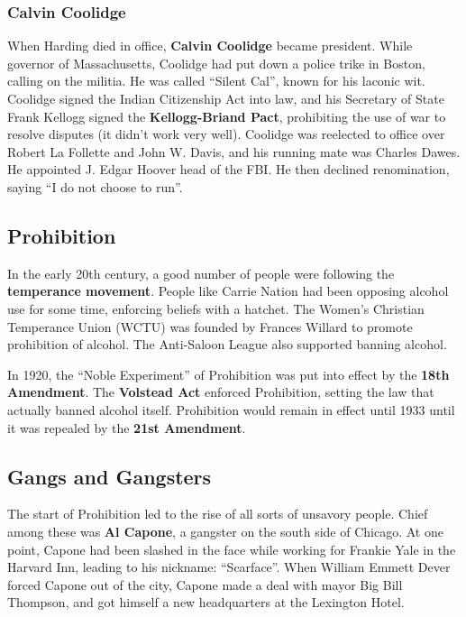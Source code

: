 \subsubsection*{Calvin Coolidge}

When Harding died in office, \textbf{Calvin Coolidge} became president.
While governor of Massachusetts, Coolidge had put down a police trike in Boston, calling on the militia.
He was called ``Silent Cal'', known for his laconic wit.
Coolidge signed the Indian Citizenship Act into law,
and his Secretary of State Frank Kellogg signed the \textbf{Kellogg-Briand Pact},
prohibiting the use of war to resolve disputes (it didn't work very well).
Coolidge was reelected to office over Robert La Follette and John W. Davis,
and his running mate was Charles Dawes.
He appointed J. Edgar Hoover head of the FBI\@.
He then declined renomination, saying ``I do not choose to run''.

\subsection*{Prohibition}

In the early 20th century, a good number of people were following the \textbf{temperance movement}.
People like Carrie Nation had been opposing alcohol use for some time,
enforcing beliefs with a hatchet.
The Women's Christian Temperance Union (WCTU)
was founded by Frances Willard to promote prohibition of alcohol.
The Anti-Saloon League also supported banning alcohol.

In 1920, the ``Noble Experiment'' of Prohibition was put into effect by the \textbf{18th Amendment}.
The \textbf{Volstead Act} enforced Prohibition, setting the law that actually banned alcohol itself.
Prohibition would remain in effect until 1933 until it was repealed by the \textbf{21st Amendment}.

\subsection*{Gangs and Gangsters}

The start of Prohibition led to the rise of all sorts of unsavory people.
Chief among these was \textbf{Al Capone}, a gangster on the south side of Chicago.
At one point, Capone had been slashed in the face while working for Frankie Yale in the Harvard Inn,
leading to his nickname: ``Scarface''.
When William Emmett Dever forced Capone out of the city,
Capone made a deal with mayor Big Bill Thompson,
and got himself a new headquarters at the Lexington Hotel.


